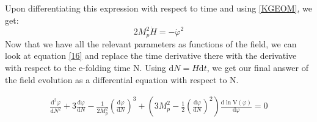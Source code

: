 \documentclass[aps,prd,reprint,preprintnumbers,showpacs,floatfix,nofootinbib,superscript address]{revtex4-2}
\begin{document}
Upon differentiating this expression with respect to time and using \ref{KGEOM}, we get:
\begin{equation} \label{H vs phi}
    2 M_p^2 \dot{H} = -   \dot{\varphi}^2
\end{equation}
Now that we have all the relevant parameters as functions of the field, we can look at equation \ref{16} and replace the time derivative there with the derivative with respect to the e-folding time N. Using $\text{d}N = H \text{d}t$, we get our final answer of the field evolution as a differential equation with respect to N.
\begin{widetext}
\begin{subequations}
\begin{align}\label{phi vs N}
    \frac{\text{d}^2\varphi}{\text{d}N^2} +3 \frac{\text{d}\varphi}{\text{d}N}  - \frac{1}{2M_p^2} \left(\frac{\text{d}\varphi}{\text{d}N} \right)^3   +  \left( 3 M_p^2 - \frac{1}{2} \left(\frac{\text{d}\varphi}{\text{d}N} \right)^2 \right) \frac{\text{d}\ln \text{V}(\varphi)}{\text{d} \varphi} = 0    
\end{align}
\end{subequations}
\end{widetext}
\end{document}
